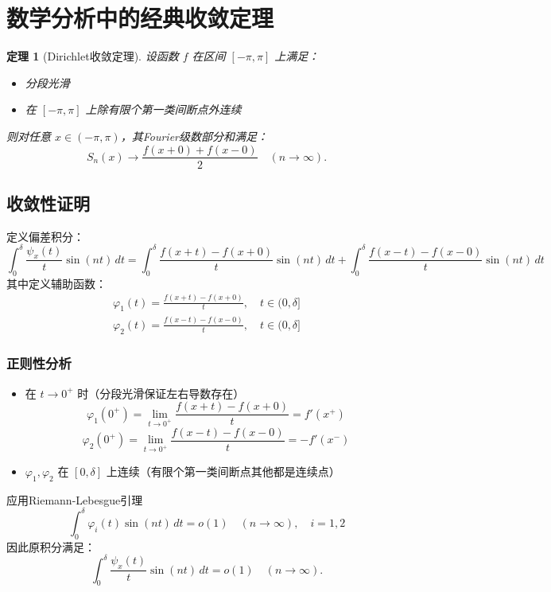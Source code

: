 \documentclass[12pt]{article}
\newtheorem{theorem}{定理}  %
\begin{document}
\section{数学分析中的经典收敛定理}

\begin{theorem}[Dirichlet收敛定理]
	设函数 $f$ 在区间 $[-\pi, \pi]$ 上满足：
	\begin{itemize}
		\item 分段光滑
		\item 在 $[-\pi, \pi]$ 上除有限个第一类间断点外连续
	\end{itemize}
	则对任意 $x \in (-\pi, \pi)$，其Fourier级数部分和满足：
	\[
	S_n(x) \to \frac{f(x+0) + f(x-0)}{2} \quad (n \to \infty).
	\]
\end{theorem}

\subsection{收敛性证明}
定义偏差积分：
\[
\int_0^\delta \frac{\psi_x(t)}{t} \sin(nt) \, dt = \int_0^\delta \frac{f(x+t)-f(x+0)}{t} \sin(nt) \, dt + \int_0^\delta \frac{f(x-t)-f(x-0)}{t} \sin(nt) \, dt
\]
其中定义辅助函数：
\[
\begin{aligned}
	\varphi_1(t) = \frac{f(x+t)-f(x+0)}{t}, \quad t \in (0, \delta] \\
	\varphi_2(t) = \frac{f(x-t)-f(x-0)}{t}, \quad t \in (0, \delta]
\end{aligned}
\]

\subsubsection{正则性分析}
\begin{itemize}
	\item 在 $t \to 0^+$ 时（分段光滑保证左右导数存在）
	\[
	\varphi_1(0^+) = \lim_{t \to 0^+} \frac{f(x+t)-f(x+0)}{t} = f'(x^+)
	\]
	\[
	\varphi_2(0^+) = \lim_{t \to 0^+} \frac{f(x-t)-f(x-0)}{t} = -f'(x^-)
	\]
	\item $\varphi_1, \varphi_2$ 在 $[0, \delta]$ 上连续（有限个第一类间断点其他都是连续点）
\end{itemize}

应用Riemann-Lebesgue引理
\[
\int_0^\delta \varphi_i(t) \sin(nt) \, dt = o(1) \quad (n \to \infty),\quad i=1,2
\]
因此原积分满足：
\[
\int_0^\delta \frac{\psi_x(t)}{t} \sin(nt) \, dt = o(1) \quad (n \to \infty).
\]


	
\end{document}
